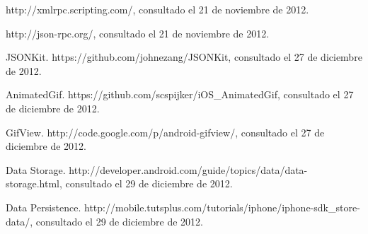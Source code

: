 \begin{thebibliography}{10}
http://xmlrpc.scripting.com/, consultado el
21 de noviembre de 2012.

http://json-rpc.org/, consultado el 21 de noviembre
de 2012.

JSONKit. https://github.com/johnezang/JSONKit,
consultado el 27 de diciembre de 2012.

AnimatedGif. https://github.com/scspijker/iOS\_AnimatedGif,
consultado el 27 de diciembre de 2012.

GifView. http://code.google.com/p/android-gifview/,
consultado el 27 de diciembre de 2012.

Data Storage. http://developer.android.com/guide/topics/data/data-storage.html,
consultado el 29 de diciembre de 2012.

Data Persistence. http://mobile.tutsplus.com/tutorials/iphone/iphone-sdk\_store-data/,
consultado el 29 de diciembre de 2012.

\end{thebibliography}
